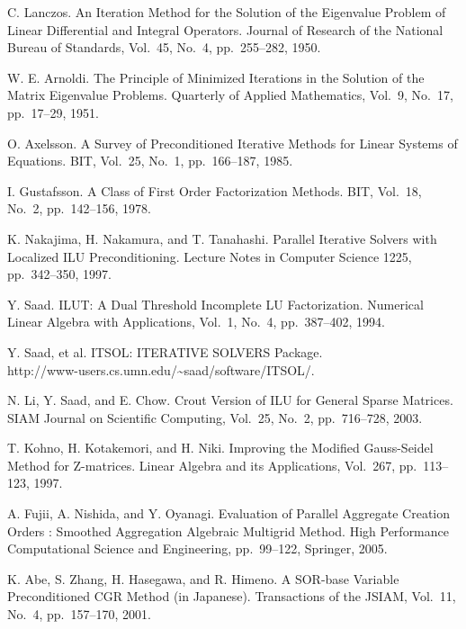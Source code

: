 \documentclass[a4paper]{article}
\begin{document}
\begin{thebibliography}{10}
C. Lanczos.
\newblock An Iteration Method for the Solution of the Eigenvalue Problem
	of Linear Differential and Integral Operators.
\newblock Journal of Research of the National Bureau of Standards, Vol.~45, No.~4, pp.\ 255--282, 1950.

W. E. Arnoldi.
\newblock The Principle of Minimized Iterations in the Solution of the Matrix Eigenvalue Problems.
\newblock Quarterly of Applied Mathematics, Vol.~9, No.~17, pp.\ 17--29, 1951.

O. Axelsson.
\newblock A Survey of Preconditioned Iterative Methods for Linear
	Systems of Equations.
\newblock BIT, Vol.~25, No.~1, pp.\ 166--187, 1985.

I. Gustafsson.
\newblock A Class of First Order Factorization Methods.
\newblock BIT, Vol.~18, No.~2, pp.\ 142--156, 1978.

K. Nakajima, H. Nakamura, and T. Tanahashi.
\newblock Parallel Iterative Solvers with Localized ILU Preconditioning.
\newblock Lecture Notes in Computer Science 1225, pp.\ 342--350, 1997.

Y. Saad.
\newblock ILUT: A Dual Threshold Incomplete LU Factorization.
\newblock Numerical Linear Algebra with Applications, Vol.~1, No.~4, pp.\ 387--402, 1994. 

Y. Saad, et al.
\newblock ITSOL: ITERATIVE SOLVERS Package. \\
\newblock http://www-users.cs.umn.edu/\textasciitilde saad/software/ITSOL/.

N. Li, Y. Saad, and E. Chow.
\newblock Crout Version of ILU for General Sparse Matrices.
\newblock SIAM Journal on Scientific Computing, Vol.~25, No.~2, pp.\ 716--728, 2003. 

T. Kohno, H. Kotakemori, and H. Niki.
\newblock Improving the Modified Gauss-Seidel Method for Z-matrices.
\newblock Linear Algebra and its Applications, Vol.~267, pp.\ 113--123, 1997.

A. Fujii, A. Nishida, and Y. Oyanagi.
\newblock Evaluation of Parallel Aggregate Creation Orders : Smoothed Aggregation Algebraic Multigrid Method.
\newblock High Performance Computational Science and Engineering, pp.\ 99--122, Springer, 2005. 

K. Abe, S. Zhang, H. Hasegawa, and R. Himeno.
\newblock A SOR-base Variable Preconditioned CGR Method (in Japanese).
\newblock Transactions of the JSIAM,  Vol.~11, No.~4, pp.\ 157--170, 2001.


\end{thebibliography}
\end{document}

